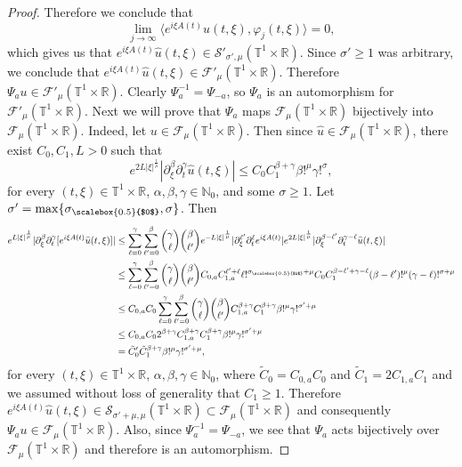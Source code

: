 \documentclass[11pt,reqno]{amsart}
\numberwithin{equation}{section}
\theoremstyle{definition}
\theoremstyle{definition}
\newcommand{\T}{\mathbb{T}}
\newcommand{\R}{\mathbb{R}}
\newcommand{\N}{\mathbb{N}}
\newcommand{\g}{\mathbb{T}^1\times\mathbb{R}}
\newcommand{\Smu}{\mathscr{F}_{\mu}(\T^1\times\R)}
\newcommand{\SSmu}{\mathscr{F}'_{\mu}(\T^1\times\R)}
\newcommand{\sigmac}{\sigma_{\scalebox{0.5}{$0$}}}
\begin{document}
\begin{proof}
     Therefore we conclude that
     \[\lim_{j\to\infty}\langle e^{i\xi A(t)}\widehat{u}(t,\xi),\varphi_j(t,\xi)\rangle=0,\]
     which gives us that $e^{i\xi A(t)}\widehat{u}(t,\xi)\in\mathcal{S}'_{\sigma',\mu}(\T^1\times\R)$. Since $\sigma'\geq 1$ was arbitrary, we conclude that $e^{i\xi A(t)}\widehat{u}(t,\xi)\in \SSmu$. Therefore $\Psi_au\in\SSmu$. Clearly $\Psi_a^{-1}=\Psi_{-a}$, so $\Psi_a$ is an automorphism for $\SSmu$. Next we will prove that $\Psi_a$ maps $\Smu$ bijectively into $\Smu$. Indeed, let $u\in\Smu$. Then since $\widehat{u}\in\Smu$, there exist $C_0,C_1,L>0$ such that 
     \begin{equation*}
         e^{2L|\xi|^{\frac{1}{\mu}}}|\partial_\xi^{\beta}\partial_t^{\gamma}\widehat{u}(t,\xi)|\leq C_0 C_1^{\beta+\gamma}\beta!^{\mu}\gamma!^{\sigma},
     \end{equation*}
     for every $(t,\xi)\in\T^1\times\R$, $\alpha,\beta,\gamma\in\N_0$, and some $\sigma\geq 1$. Let $\sigma'=\max\{\sigmac,\sigma\}$. Then
     \begin{align*}
         e^{L|\xi|^{\frac{1}{\mu}}}|\partial_\xi^{\beta}\partial_t^\gamma[e^{i\xi A(t)}\widehat{u}(t,\xi)]|&\leq  \sum_{\ell=0}^\gamma\sum_{\ell'=0}^{\beta}\binom{\gamma}{\ell}\binom{\beta}{\ell'}e^{-L|\xi|^{\frac{1}{\mu}}}|\partial_\xi^{\ell'}\partial_t^\ell e^{i\xi A(t)}|e^{2L|\xi|^{\frac{1}{\mu}}}|\partial_\xi^{\beta-\ell'}\partial_t^{\gamma-\ell}\widehat{u}(t,\xi)|\\
         &\leq \sum_{\ell=0}^\gamma\sum_{\ell'=0}^{\beta}\binom{\gamma}{\ell}\binom{\beta}{\ell'} C_{0,a}C_{1,a}^{\ell'+\ell}\ell!^{\sigmac+\mu}C_0 C_1^{\beta-\ell'+\gamma-\ell}(\beta-\ell')!^{\mu}(\gamma-\ell)!^{\sigma+\mu}\\
         &\leq C_{0,a}C_0\sum_{\ell=0}^\gamma\sum_{\ell'=0}^{\beta}\binom{\gamma}{\ell}\binom{\beta}{\ell'} C_{1,a}^{\beta+\gamma}C_1^{\beta+\gamma}\beta!^{\mu}\gamma!^{\sigma'+\mu}\\
         &\leq C_{0,a}C_02^{\beta+\gamma}C_{1,a}^{\beta+\gamma}C_1^{\beta+\gamma}\beta!^{\mu}\gamma!^{\sigma'+\mu}\\
        &=\tilde{C}_0'\tilde{C}_1^{\beta+\gamma}\beta!^{\mu} \gamma!^{\sigma'+\mu},
         \end{align*}
        for every $(t,\xi)\in\T^1\times\R$, $\alpha,\beta,\gamma\in\N_0$, where $\tilde{C}_0=C_{0,a}C_0$ and $\tilde{C}_1=2C_{1,a}C_1$ and we assumed without loss of generality that $C_1\geq 1$. Therefore $e^{i\xi A(t)}\widehat{u}(t,\xi)\in \mathcal{S}_{\sigma'+\mu,\mu}(\g)\subset\Smu$ and consequently $\Psi_au\in\Smu$. Also, since $\Psi_a^{-1}=\Psi_{-a}$, we see that $\Psi_a$ acts bijectively over $\Smu$ and therefore is an automorphism. 


\end{proof}
\end{document}
